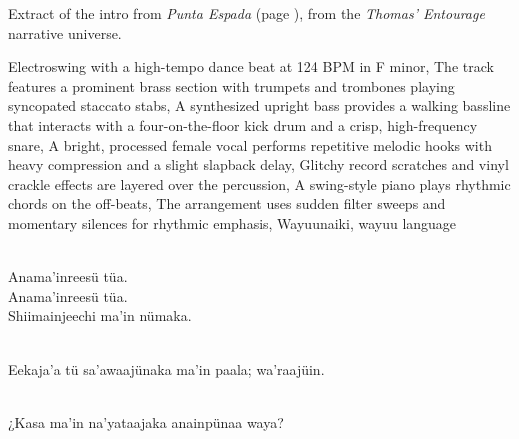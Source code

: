 
\begin{notes}
Extract of the intro from \emph{Punta Espada} (page \pageref{sec:punta-espada}), from the \emph{Thomas’ Entourage} narrative universe.
\end{notes}
\begin{style}
Electroswing with a high-tempo dance beat at 124 BPM in F minor, The track features a prominent brass section with trumpets and trombones playing syncopated staccato stabs, A synthesized upright bass provides a walking bassline that interacts with a four-on-the-floor kick drum and a crisp, high-frequency snare, A bright, processed female vocal performs repetitive melodic hooks with heavy compression and a slight slapback delay, Glitchy record scratches and vinyl crackle effects are layered over the percussion, A swing-style piano plays rhythmic chords on the off-beats, The arrangement uses sudden filter sweeps and momentary silences for rhythmic emphasis, Wayuunaiki, wayuu language
\end{style}
\begin{lyrics}
\\
Anama'inreesü tüa.
\\
Anama'inreesü tüa.
\\
Shiimainjeechi ma'in nümaka.

\\
Eekaja'a tü sa'awaajünaka ma'in paala; wa'raajüin.

\\
¿Kasa ma'in na'yataajaka anainpünaa waya?
\end{lyrics}

